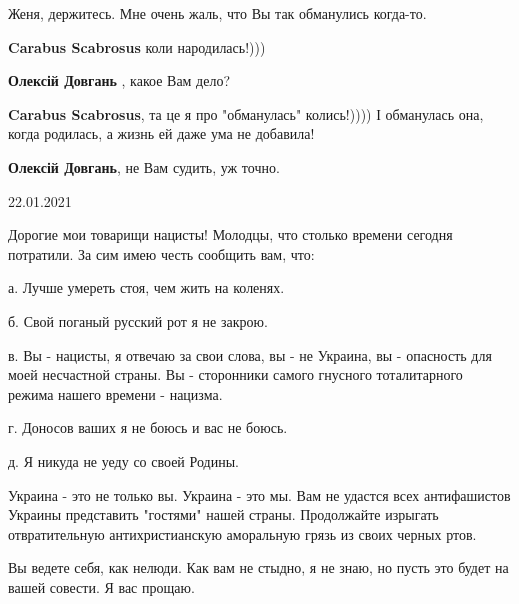 \begin{itemize}
 
Женя, держитесь. Мне очень жаль, что Вы так обманулись когда-то.

\begin{itemize}
 
\textbf{Carabus Scabrosus} коли народилась!)))

 
\textbf{Олексій Довгань} , какое Вам дело?

 
\textbf{Carabus Scabrosus}, та це я про "обманулась" колись!)))) І обманулась она, когда родилась, а жизнь ей даже ума не добавила!

 
\textbf{Олексій Довгань}, не Вам судить, уж точно.
\end{itemize}


22.01.2021

Дорогие мои товарищи нацисты! Молодцы, что столько времени сегодня потратили.
За сим имею честь сообщить вам, что: 

а. Лучше умереть стоя, чем жить на коленях. 

б. Свой поганый русский рот я не закрою. 

в. Вы - нацисты, я отвечаю за свои слова, вы - не Украина, вы - опасность для
моей несчастной страны. Вы - сторонники самого гнусного тоталитарного режима
нашего времени - нацизма. 

г. Доносов ваших я не боюсь и вас не боюсь. 

д. Я никуда не уеду со своей Родины.

Украина - это не только вы. Украина - это мы. Вам не удастся всех антифашистов
Украины представить "гостями" нашей страны. Продолжайте изрыгать отвратительную
антихристианскую аморальную грязь из своих черных ртов. 

Вы ведете себя, как нелюди. Как вам не стыдно, я не знаю, но пусть это будет на
вашей совести. Я вас прощаю.

\end{itemize}

